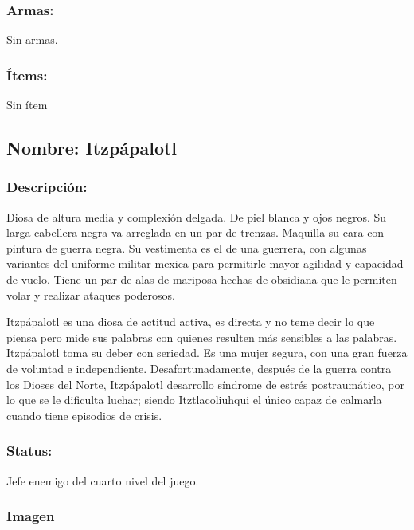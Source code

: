 \documentclass[11pt,letterpaper]{article}
\begin{document}
\subsubsection{Armas:}
Sin armas.
\subsubsection{Ítems:}
Sin ítem


\subsection{Nombre: Itzpápalotl}  \label{per.itzpapalotl}
\subsubsection{Descripción:}
Diosa de altura media y complexión delgada. De piel blanca y ojos negros. Su larga cabellera negra va arreglada en un par de trenzas. Maquilla su cara con pintura de guerra negra. Su vestimenta es el de una guerrera, con algunas variantes del uniforme militar mexica para permitirle mayor agilidad y capacidad de vuelo.  Tiene un par de alas de mariposa hechas de obsidiana que le permiten volar y realizar ataques poderosos.    

Itzpápalotl es una diosa de actitud activa, es directa y no teme decir lo que piensa pero mide sus palabras con quienes resulten más sensibles a las palabras. Itzpápalotl toma su deber con seriedad. Es una mujer segura, con una gran fuerza de voluntad e independiente. Desafortunadamente, después de la guerra contra los Dioses del Norte, Itzpápalotl desarrollo síndrome de estrés postraumático, por lo que se le dificulta luchar; siendo Itztlacoliuhqui  el único capaz de calmarla cuando tiene episodios de crisis.
\subsubsection{Status:}
Jefe enemigo del cuarto nivel del juego.
\subsubsection{Imagen}
\end{document}
